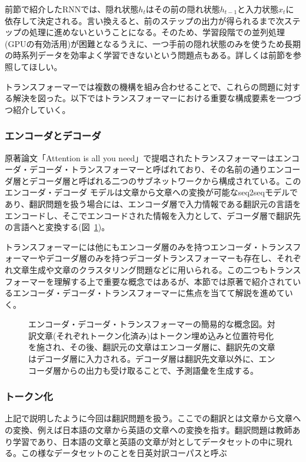 
前節で紹介したRNNでは、隠れ状態$h_t$はその前の隠れ状態$h_{t-1}$と入力状態$x_t$に依存して決定される。言い換えると、前のステップの出力が得られるまで次ステップの処理に進めないということになる。そのため、学習段階での並列処理(GPUの有効活用)が困難となるうえに、一つ手前の隠れ状態のみを使うため長期の時系列データを効率よく学習できないという問題点もある。詳しくは前節を参照してほしい。



トランスフォーマーでは複数の機構を組み合わせることで、これらの問題に対する解決を図った。以下ではトランスフォーマーにおける重要な構成要素を一つづつ紹介していく。



\subsubsection{エンコーダとデコーダ}
原著論文「Attention is all you need」で提唱されたトランスフォーマーはエンコーダ・デコーダ・トランスフォーマーと呼ばれており、その名前の通りエンコーダ層とデコーダ層と呼ばれる二つのサブネットワークから構成されている。このエンコーダ・デコーダ モデルは文章から文章への変換が可能なseq2seqモデルであり、翻訳問題を扱う場合には、エンコーダ層で入力情報である翻訳元の言語をエンコードし、そこでエンコードされた情報を入力として、デコーダ層で翻訳先の言語へと変換する(図~\ref{fig:ed-transformer})。

トランスフォーマーには他にもエンコーダ層のみを持つエンコーダ・トランスフォーマーやデコーダ層のみを持つデコーダトランスフォーマーも存在し、それぞれ文章生成や文章のクラスタリング問題などに用いられる。この二つもトランスフォーマーを理解する上で重要な概念ではあるが、本節では原著で紹介されているエンコーダ・デコーダ・トランスフォーマーに焦点を当てて解説を進めていく。

\begin{figure}[htp]
  \centering
  \caption{エンコーダ・デコーダ・トランスフォーマーの簡易的な概念図。対訳文章(それぞれトークン化済み)はトークン埋め込みと位置符号化を施され、その後、翻訳元の文章はエンコーダ層に、翻訳先の文章はデコーダ層に入力される。デコーダ層は翻訳先文章以外に、エンコーダ層からの出力も受け取ることで、予測語彙を生成する。}
 
\label{fig:ed-transformer}
\end{figure}


\subsubsection{トークン化}
上記で説明したように今回は翻訳問題を扱う。ここでの翻訳とは文章から文章への変換、例えば日本語の文章から英語の文章への変換を指す。翻訳問題は教師あり学習であり、日本語の文章と英語の文章が対としてデータセットの中に現れる。この様なデータセットのことを日英対訳コーパスと呼ぶ

